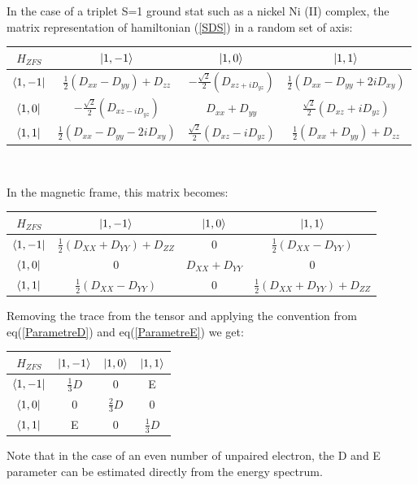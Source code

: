 \documentclass[10pt]{report}
\numberwithin{equation}{section}
\begin{document}
In the case of a triplet S=1 ground stat such as a nickel Ni (II) complex, the matrix representation of hamiltonian (\ref{SDS}) in a random set of axis:
\begin{center}
\begin{tabular}{ c | c c c}
    $H_{ZFS}$ & $\ket{1,-1}$ & $\ket{1,0} $& $\ket{1,1}$ \\
    \hline
    $\bra{1,-1} $&  $\frac{1}{2}(D_{xx}-D_{yy})+D_{zz}$ & $-\frac{\sqrt{2}}{2}(D_{xz+iD_{yz}}) $ & $\frac{1}{2}(D_{xx}-D_{yy}+2iD_{xy})$ \\
    $\bra{1,0}$ & $-\frac{\sqrt{2}}{2}(D_{xz-iD_{yz}})  $& $ D_{xx}+D_{yy}  $&$ \frac{\sqrt{2}}{2}(D_{xz}+iD_{yz})$ \\
    $\bra{1,1} $& $ \frac{1}{2}(D_{xx}-D_{yy}-2iD_{xy}) $& $\frac{\sqrt{2}}{2}(D_{xz}-iD_{yz})$  & $\frac{1}{2}(D_{xx}+D_{yy})+D_{zz} $ \\
\end{tabular}\\
\end{center}
In the magnetic frame, this matrix becomes:
\begin{center}
\begin{tabular}{c | c c c}
    $H_{ZFS}$ & $\ket{1,-1}$ & $\ket{1,0} $& $\ket{1,1}$ \\
    \hline
    $\bra{1,-1}$ & $\frac{1}{2}(D_{XX}+D_{YY})+D_{ZZ}$ & 0 & $\frac{1}{2}(D_{XX}-D_{YY})$\\
    $\bra{1,0}$ & 0 & $D_{XX}+D_{YY}$ & 0\\
    $\bra{1,1}$ &  $\frac{1}{2}(D_{XX}-D_{YY})$ & 0 & $\frac{1}{2}(D_{XX}+D_{YY})+D_{ZZ}$
\end{tabular}
\end{center}
Removing the trace from the tensor and applying the convention from eq(\ref{ParametreD}) and eq(\ref{ParametreE}) we get:
\begin{center}
\begin{tabular}{c | c c c}
    $H_{ZFS}$ & $\ket{1,-1}$ & $\ket{1,0}$ & $\ket{1,1}$\\
    \hline
    $\bra{1,-1}$ & $\frac{1}{3}D$ & 0 & E\\
    $\bra{1,0}$ & 0 & $\frac{2}{3}D $& 0\\
    $\bra{1,1}$ & E & 0 & $\frac{1}{3}D$
\end{tabular}
\end{center}
Note that in the case of an even number of unpaired electron, the D and E parameter can be estimated directly from the energy spectrum.
\end{document}
